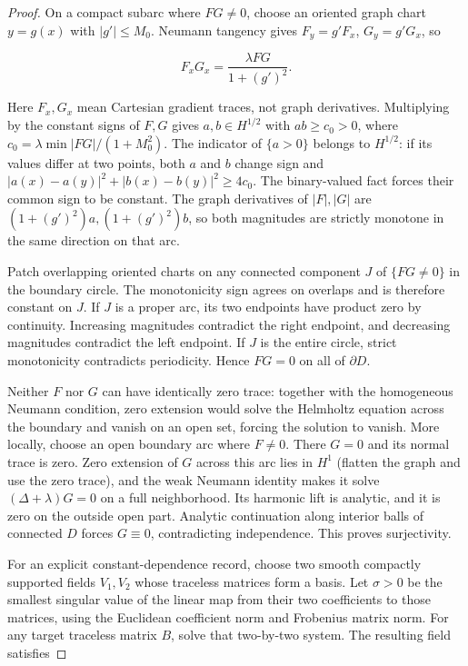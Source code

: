 \documentclass[11pt]{article}
\theoremstyle{definition}
\theoremstyle{remark}
\numberwithin{equation}{section}
\begin{document}
\begin{proof}
On a compact subarc where $FG\ne0$, choose an oriented graph chart $y=g(x)$ with $|g'|\le M_0$. Neumann tangency gives $F_y=g'F_x$, $G_y=g'G_x$, so

\begin{equation}\label{eq:src-11-05}
F_xG_x=\frac{\lambda FG}{1+(g')^2}.
\end{equation}

Here $F_x,G_x$ mean Cartesian gradient traces, not graph derivatives. Multiplying by the constant signs of $F,G$ gives $a,b\in H^{1/2}$ with $ab\ge c_0>0$, where $c_0=\lambda\min|FG|/(1+M_0^2)$. The indicator of $\{a>0\}$ belongs to $H^{1/2}$: if its values differ at two points, both $a$ and $b$ change sign and $|a(x)-a(y)|^2+|b(x)-b(y)|^2\ge4c_0$. The binary-valued fact forces their common sign to be constant. The graph derivatives of $|F|,|G|$ are $(1+(g')^2)a,(1+(g')^2)b$, so both magnitudes are strictly monotone in the same direction on that arc.

Patch overlapping oriented charts on any connected component $J$ of $\{FG\ne0\}$ in the boundary circle. The monotonicity sign agrees on overlaps and is therefore constant on $J$. If $J$ is a proper arc, its two endpoints have product zero by continuity. Increasing magnitudes contradict the right endpoint, and decreasing magnitudes contradict the left endpoint. If $J$ is the entire circle, strict monotonicity contradicts periodicity. Hence $FG=0$ on all of $\partial D$.

Neither $F$ nor $G$ can have identically zero trace: together with the homogeneous Neumann condition, zero extension would solve the Helmholtz equation across the boundary and vanish on an open set, forcing the solution to vanish. More locally, choose an open boundary arc where $F\ne0$. There $G=0$ and its normal trace is zero. Zero extension of $G$ across this arc lies in $H^1$ (flatten the graph and use the zero trace), and the weak Neumann identity makes it solve $(\Delta+\lambda)G=0$ on a full neighborhood. Its harmonic lift is analytic, and it is zero on the outside open part. Analytic continuation along interior balls of connected $D$ forces $G\equiv0$, contradicting independence. This proves surjectivity.

For an explicit constant-dependence record, choose two smooth compactly supported fields $V_1,V_2$ whose traceless matrices form a basis. Let $\sigma>0$ be the smallest singular value of the linear map from their two coefficients to those matrices, using the Euclidean coefficient norm and Frobenius matrix norm. For any target traceless matrix $B$, solve that two-by-two system. The resulting field satisfies


\end{proof}
\end{document}
